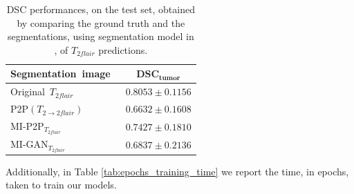 \begin{table}[H]
\centering
\fontsize{11}{17}\selectfont
\begin{tabular}{l|c}
\toprule
\textbf{Segmentation\  image\ } & $\mathbf{DSC_{tumor}}$\\
\hline
Original\ {${T_{2flair}}$} & $\mathrm{0.8053\pm0.1156}$\\
\hline
P2P$(T_{2 \rightarrow 2flair})$ & $\mathrm{0.6632\pm0.1608}$\\

MI-P2P{$_{T_{2flair}}$} & $\mathbf{0.7427\pm0.1810}$\\

MI-GAN{$_{T_{2flair}}$} & $\mathrm{0.6837\pm0.2136}$\\
\midrule
\end{tabular}
\caption[Segmentation performances (on test set) using  $T_{2flair}$ predictions]{DSC performances, on the test set, obtained by comparing the ground truth and the segmentations, using segmentation model in \cite{giacomello2019brain}, of $T_{2flair}$ predictions.}
\label{tab:dice}
\end{table}

\vspace{5mm}
\noindent Additionally, in Table \ref{tab:epochs_training_time} we report the time, in epochs, taken to train our models.

